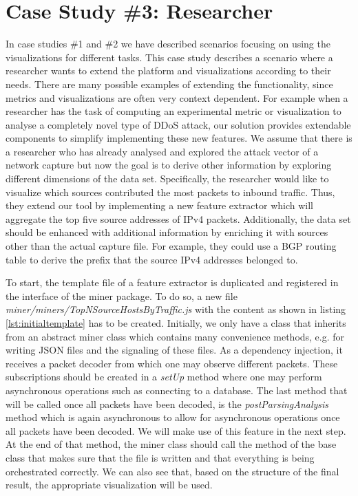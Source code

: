 \section{Case Study \#3: Researcher} \label{casestudyresearcher}
In case studies \#1 and \#2 we have described scenarios focusing on using the visualizations for different tasks. This case study describes a scenario where a researcher wants to extend the platform and visualizations according to their needs. There are many possible examples of extending the functionality, since metrics and visualizations are often very context dependent. For example when a researcher has the task of computing an experimental metric or visualization to analyse a completely novel type of DDoS attack, our solution provides  extendable components to simplify implementing these new features.  We assume that there is a researcher who has already analysed and explored the attack vector of a network capture but now the goal is to derive other information by exploring different dimensions of the data set. Specifically, the researcher would like to visualize which sources contributed the most packets to inbound traffic. Thus, they extend our tool by implementing a new feature extractor which will aggregate the top five source addresses of IPv4 packets. Additionally, the data set should be enhanced with additional information by enriching it with sources other than the actual capture file. For example, they could use a BGP routing table to derive the prefix that the source IPv4 addresses belonged to.

To start, the template file of a feature extractor is duplicated and registered in the interface of the miner package. To do so, a new file \textit{miner/miners/TopNSourceHostsByTraffic.js} with the content as shown in listing \ref{lst:initialtemplate} has to be created.
Initially, we only have a class that inherits from an abstract miner class which contains many convenience methods, e.g. for writing JSON files and the signaling of these files. As a dependency injection, it receives a packet decoder from which one may observe different packets. These subscriptions should be created in a \textit{setUp} method where one may perform asynchronous operations such as connecting to a database. The last method that will be called once all packets have been decoded, is the \textit{postParsingAnalysis} method which is again asynchronous to allow for asynchronous operations once all packets have been decoded. We will make use of this feature in the next step. At the end of that method, the miner class should call the method of the base class that makes sure that the file is written and that everything is being orchestrated correctly. We can also see that, based on the structure of the final result, the appropriate visualization will be used.


